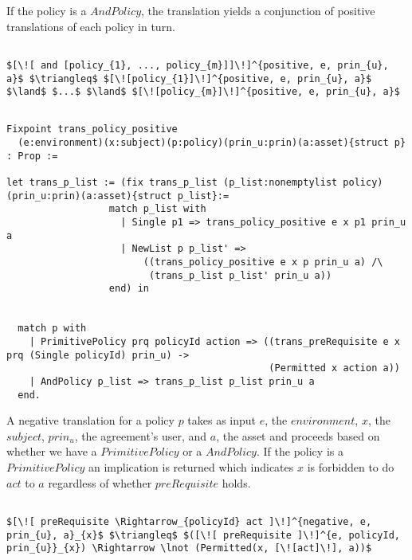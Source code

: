 If the policy is a $AndPolicy$, the translation yields a conjunction of positive translations of each policy in turn.

\lstset{mathescape, language=AST}  
\begin{lstlisting}[frame=single, caption={Positive Policy Translation {$\colon$} List of policies},label={lst:transpolicypositiveListOfPolicies}]

$[\![ and [policy_{1}, ..., policy_{m}]]\!]^{positive, e, prin_{u}, a}$ $\triangleq$ $[\![policy_{1}]\!]^{positive, e, prin_{u}, a}$ $\land$ $...$ $\land$ $[\![policy_{m}]\!]^{positive, e, prin_{u}, a}$

\end{lstlisting}



\begin{lstlisting}

Fixpoint trans_policy_positive
  (e:environment)(x:subject)(p:policy)(prin_u:prin)(a:asset){struct p} : Prop :=

let trans_p_list := (fix trans_p_list (p_list:nonemptylist policy)(prin_u:prin)(a:asset){struct p_list}:=
                  match p_list with
                    | Single p1 => trans_policy_positive e x p1 prin_u a
                    | NewList p p_list' => 
                        ((trans_policy_positive e x p prin_u a) /\ 
                         (trans_p_list p_list' prin_u a))
                  end) in


  match p with
    | PrimitivePolicy prq policyId action => ((trans_preRequisite e x prq (Single policyId) prin_u) ->
                                              (Permitted x action a))
    | AndPolicy p_list => trans_p_list p_list prin_u a
  end.
\end{lstlisting}


A negative translation for a policy $p$ takes as input $e$, the $environment$, $x$, the $subject$, $prin_{u}$, the agreement's user, and $a$, the asset and proceeds based on whether we have a $PrimitivePolicy$ or a $AndPolicy$. If the policy is a $PrimitivePolicy$ an implication is returned which indicates $x$ is forbidden to do $act$ to $a$ regardless of whether $preRequisite$ holds.


\lstset{mathescape, language=AST}  
\begin{lstlisting}[frame=single, caption={Negative Policy Translation {$\colon$} Single policy},label={lst:transpolicynegativeSingle}]

$[\![ preRequisite \Rightarrow_{policyId} act ]\!]^{negative, e, prin_{u}, a}_{x}$ $\triangleq$ $([\![ preRequisite ]\!]^{e, policyId, prin_{u}}_{x}) \Rightarrow \lnot (Permitted(x, [\![act]\!], a))$
\end{lstlisting}

